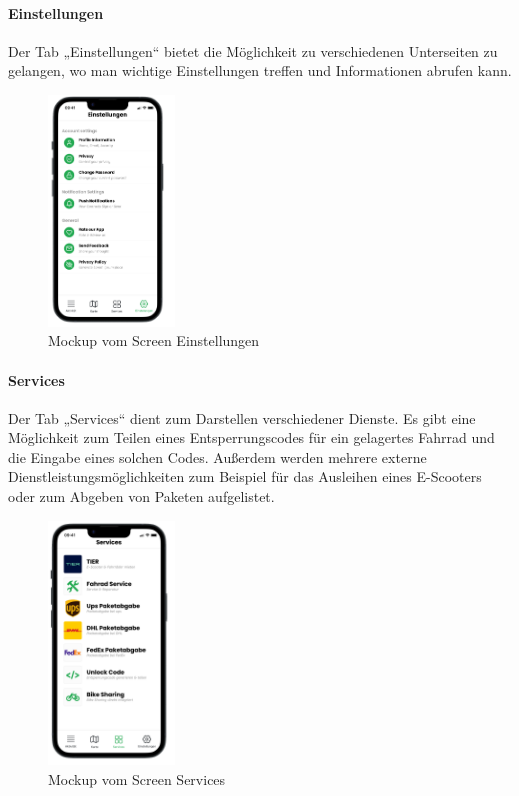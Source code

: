 \paragraph{Einstellungen}Der Tab „Einstellungen“ bietet die Möglichkeit zu verschiedenen Unterseiten zu gelangen, wo man wichtige Einstellungen treffen und Informationen abrufen kann.\\
\begin{figure}[ht]
  \centering
  \includegraphics[width=0.3\textwidth]{images/app_mock_settings}
  \caption{Mockup vom Screen Einstellungen}
  \label{fig:screensettings}
\end{figure}

\paragraph{Services}Der Tab „Services“ dient zum Darstellen verschiedener Dienste. Es gibt eine Möglichkeit zum Teilen eines Entsperrungscodes für ein gelagertes Fahrrad und die Eingabe eines solchen Codes. Außerdem werden mehrere externe Dienstleistungsmöglichkeiten zum Beispiel für das Ausleihen eines E-Scooters oder zum Abgeben von Paketen aufgelistet.\\
\begin{figure}[ht]
  \centering
  \includegraphics[width=0.3\textwidth]{images/app_mock_services}
  \caption{Mockup vom Screen Services}
  \label{fig:screenservices}
\end{figure}


